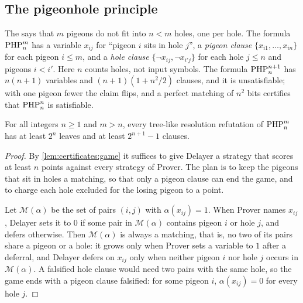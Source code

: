 \begin{refsection}
\subsection{The pigeonhole principle}

The  says that $m$ pigeons do not fit into $n<m$ holes, one per hole. The formula $\mathrm{PHP}^{m}_{n}$ has a variable $x_{ij}$ for ``pigeon $i$ sits in hole $j$'', a \emph{pigeon clause} $\{x_{i1},\dots,x_{in}\}$ for each pigeon $i\le m$, and a \emph{hole clause} $\{\neg x_{ij},\neg x_{i'j}\}$ for each hole $j\le n$ and pigeons $i<i'$. Here $n$ counts holes, not input symbols. The formula $\mathrm{PHP}^{n+1}_{n}$ has $n(n+1)$ variables and $(n+1)(1+n^2/2)$ clauses, and it is unsatisfiable; with one pigeon fewer the claim flips, and a perfect matching of $n^2$ bits certifies that $\mathrm{PHP}^{n}_{n}$ is satisfiable.

\begin{theorem}\label{thm:certificates:php}
For all integers $n\ge1$ and $m>n$, every tree-like resolution refutation of $\mathrm{PHP}^{m}_{n}$ has at least $2^n$ leaves and at least $2^{n+1}-1$ clauses.
\end{theorem}

\begin{proof}
By \cref{lem:certificates:game} it suffices to give Delayer a strategy that scores at least $n$ points against every strategy of Prover. The plan is to keep the pigeons that sit in holes a matching, so that only a pigeon clause can end the game, and to charge each hole excluded for the losing pigeon to a point.

Let $\mathcal{M}(\alpha)$ be the set of pairs $(i,j)$ with $\alpha(x_{ij})=1$. When Prover names $x_{ij}$, Delayer sets it to $0$ if some pair in $\mathcal{M}(\alpha)$ contains pigeon $i$ or hole $j$, and defers otherwise. Then $\mathcal{M}(\alpha)$ is always a matching, that is, no two of its pairs share a pigeon or a hole: it grows only when Prover sets a variable to $1$ after a deferral, and Delayer defers on $x_{ij}$ only when neither pigeon $i$ nor hole $j$ occurs in $\mathcal{M}(\alpha)$. A falsified hole clause would need two pairs with the same hole, so the game ends with a pigeon clause falsified: for some pigeon $i$, $\alpha(x_{ij})=0$ for every hole $j$.


\end{proof}
\end{refsection}

